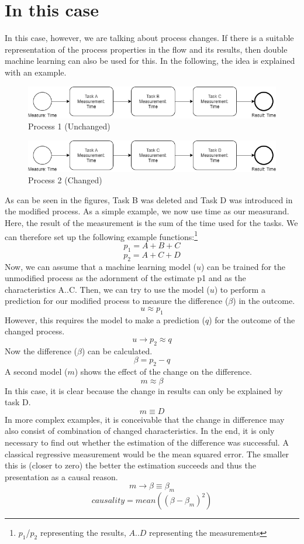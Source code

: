     \section{In this case}
    In this case, however, we are talking about process changes. If there is a suitable representation of the process properties in the flow and its results, then double machine learning can also be used for this. In the following, the idea is explained with an example.
    \begin{figure}[H]
        \centering
        \includegraphics[width=0.99\textwidth-2\fboxsep-2\fboxrule]{includes/p1.png}
        \caption{Process 1 (Unchanged)}
        \label{p1}
    \end{figure}
    \begin{figure}[H]
        \centering
        \includegraphics[width=0.99\textwidth-2\fboxsep-2\fboxrule]{includes/p2.png}
        \caption{Process 2 (Changed)}
        \label{p2}
    \end{figure}
    As can be seen in the figures, Task B was deleted and Task D was introduced in the modified process. As a simple example, we now use time as our measurand. Here, the result of the measurement is the sum of the time used for the tasks. We can therefore set up the following example functions:\footnote{$p_1$/$p_2$ representing the results, $A$..$D$ representing the measurements}\\
    \[p_1 = A + B + C\]
    \[p_2 = A + C + D\]
    Now, we can assume that a machine learning model ($u$) can be trained for the unmodified process as the adornment of the estimate p1 and as the characteristics A..C. Then, we can try to use the model ($u$) to perform a prediction for our modified process to measure the difference ($\beta$) in the outcome.
    \[u \approx p_1\]
    However, this requires the model to make a prediction ($q$) for the outcome of the changed process.
    \[u \rightarrow p_2 \approx q\]
    Now the difference ($\beta$) can be calculated.
    \[\beta = p_2 - q\]
    A second model ($m$) shows the effect of the change on the difference.
    \[m \approx \beta\]
    In this case, it is clear because the change in results can only be explained by task D.
    \[m \equiv D\]
    In more complex examples, it is conceivable that the change in difference may also consist of combination of changed characteristics. In the end, it is only necessary to find out whether the estimation of the difference was successful. A classical regressive measurement would be the mean squared error. The smaller this is (closer to zero) the better the estimation succeeds and thus the presentation as a causal reason.
    \[m \rightarrow \beta \equiv \beta_m\]
    \[causality = mean((\beta-\beta_m)^2)\]
\clearpage
